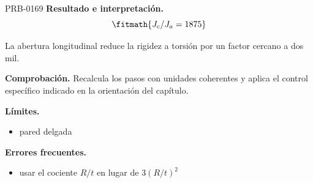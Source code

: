 \begin{studiumworked}{PRB-0169}
\textbf{Resultado e interpretación.}\[\fitmath{J_c/J_a = 1875}\]

La abertura longitudinal reduce la rigidez a torsión por un factor cercano a dos mil.

\par\textbf{Comprobación.} Recalcula los pasos con unidades coherentes y aplica el control específico indicado en la orientación del capítulo.

\textbf{Límites.}\begin{itemize}\item pared delgada\end{itemize}

\textbf{Errores frecuentes.}\begin{itemize}\item usar el cociente $R/t$ en lugar de $3(R/t)^2$\end{itemize}

\end{studiumworked}

\Needspace{.3\textheight}


